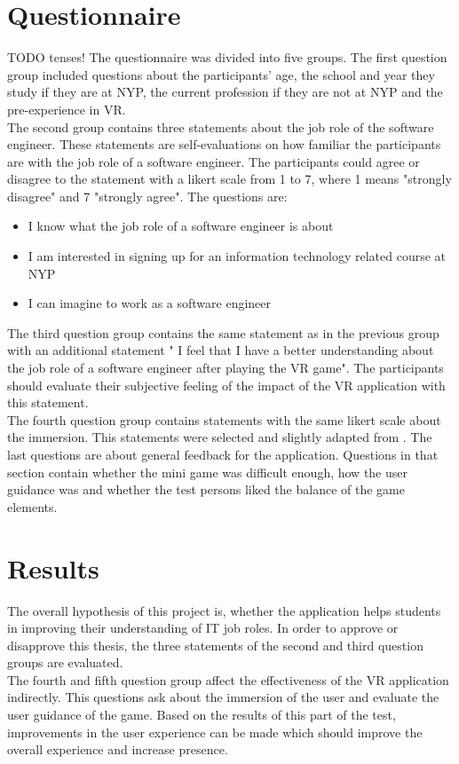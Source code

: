 \section{Questionnaire}
TODO tenses!
The questionnaire was divided into five groups. The first question group included questions about the participants' age, the school and year they study if they are at NYP, the current profession if they are not at NYP and the pre-experience in VR.\\
The second group contains three statements about the job role of the software engineer. These statements are self-evaluations on how familiar the participants are with the job role of a software engineer. The participants could agree or disagree to the statement with a likert scale from 1 to 7, where 1 means "strongly disagree" and 7 "strongly agree". The questions are:
\begin{itemize}
\item I know what the job role of a software engineer is about 
\item  I am interested in signing up for an information technology related course at NYP 
\item  I can imagine to work as a software engineer 
\end{itemize}
The third question group contains the same statement as in the previous group with an additional statement " I feel that I have a better understanding about the job role of a software engineer after playing the VR game". The participants should evaluate their subjective feeling of the impact of the VR application with this statement.\\
The fourth question group contains statements with the same likert scale about the immersion. This statements were selected and slightly adapted from \cite{??}.
The last questions are about general feedback for the application. Questions in that section contain whether the mini game was difficult enough, how the user guidance was and whether the test persons liked the balance of the game elements.

\section{Results}
The overall hypothesis of this project is, whether the application helps students in improving their understanding of IT job roles.
In order to approve or disapprove this thesis, the three statements of the second and third question groups are evaluated.\\
The fourth and fifth question group affect the effectiveness of the VR application indirectly. This questions ask about the immersion of the user and evaluate the user guidance of the game. Based on the results of this part of the test, improvements in the user experience can be made which should improve the overall experience and increase presence.
\newpage
